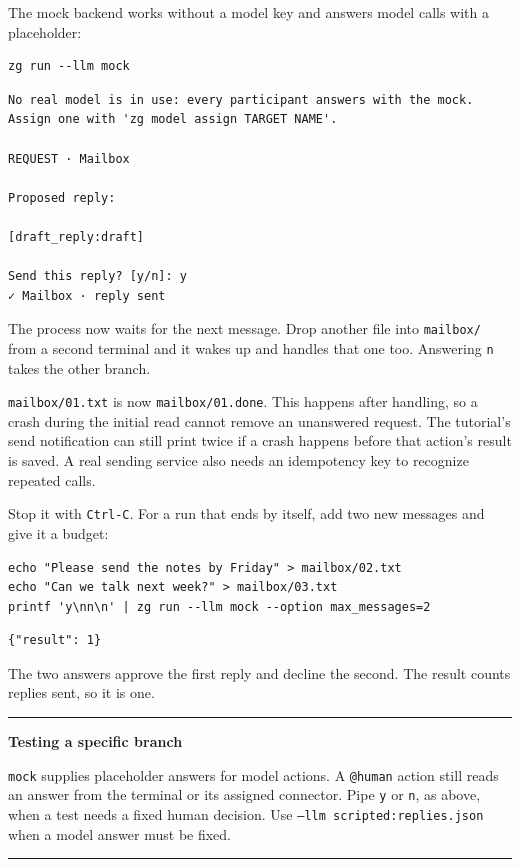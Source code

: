 \documentclass[11pt,a4paper]{article}
\newenvironment{notebox}[1]
{\begin{center}\begin{minipage}{0.94\linewidth}
 \color{ZipperInk}\hrule\vspace{5pt}\textbf{#1}\par\smallskip}
{\vspace{5pt}\hrule\end{minipage}\end{center}}
\begin{document}
The mock backend works without a model key and answers model calls with a
placeholder:

\begin{lstlisting}[style=shell]
zg run --llm mock
\end{lstlisting}

\begin{lstlisting}
No real model is in use: every participant answers with the mock. Assign one with 'zg model assign TARGET NAME'.

REQUEST · Mailbox

Proposed reply:

[draft_reply:draft]

Send this reply? [y/n]: y
✓ Mailbox · reply sent
\end{lstlisting}

The process now waits for the next message. Drop another file into
\texttt{mailbox/} from a second terminal and it wakes up and handles that one
too. Answering \texttt{n} takes the other branch.

\texttt{mailbox/01.txt} is now \texttt{mailbox/01.done}. This happens after
handling, so a crash during the initial read cannot remove an unanswered
request. The tutorial's send notification can still print twice if a crash
happens before that action's result is saved. A real sending service also
needs an idempotency key to recognize repeated calls.

Stop it with \texttt{Ctrl-C}. For a run that ends by itself, add two new
messages and give it a budget:

\begin{lstlisting}[style=shell]
echo "Please send the notes by Friday" > mailbox/02.txt
echo "Can we talk next week?" > mailbox/03.txt
printf 'y\nn\n' | zg run --llm mock --option max_messages=2
\end{lstlisting}

\begin{lstlisting}
{"result": 1}
\end{lstlisting}

The two answers approve the first reply and decline the second. The result
counts replies sent, so it is one.

\begin{notebox}{Testing a specific branch}
\texttt{mock} supplies placeholder answers for model actions. A
\texttt{@human} action still reads an answer from the terminal or its assigned
connector. Pipe \texttt{y} or \texttt{n}, as above, when a test needs a fixed
human decision. Use \texttt{--llm scripted:replies.json} when a model answer
must be fixed.
\end{notebox}
\end{document}

